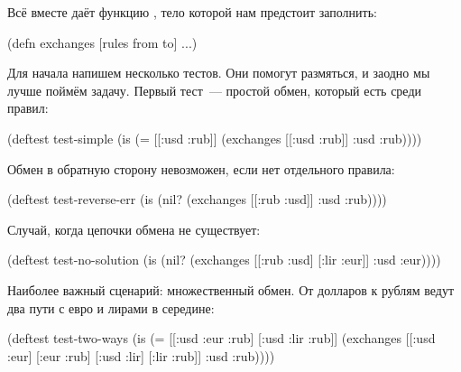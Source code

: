 Всё вместе даёт функцию , тело которой нам предстоит заполнить:

\begin{english}
  \begin{clojure}
(defn exchanges
  [rules from to]
  ...)
  \end{clojure}
\end{english}


Для начала напишем несколько тестов. Они помогут размяться, и заодно мы лучше
поймём задачу. Первый тест~--- простой обмен, который есть среди правил:

\begin{english}
  \begin{clojure}
(deftest test-simple
  (is (= [[:usd :rub]]
         (exchanges [[:usd :rub]]
                    :usd
                    :rub))))
  \end{clojure}
\end{english}

Обмен в обратную сторону невозможен, если нет отдельного правила:

\begin{english}
  \begin{clojure}
(deftest test-reverse-err
  (is (nil? (exchanges [[:rub :usd]]
                       :usd
                       :rub))))
  \end{clojure}
\end{english}

Случай, когда цепочки обмена не существует:

\begin{english}
  \begin{clojure}
(deftest test-no-solution
  (is (nil? (exchanges [[:rub :usd]
                        [:lir :eur]]
                       :usd
                       :eur))))
  \end{clojure}
\end{english}

Наиболее важный сценарий: множественный обмен. От долларов к рублям ведут два
пути с евро и лирами в середине:

\begin{english}
  \begin{clojure}
(deftest test-two-ways
  (is (= [[:usd :eur :rub]
          [:usd :lir :rub]]
         (exchanges [[:usd :eur]
                     [:eur :rub]
                     [:usd :lir]
                     [:lir :rub]] :usd :rub))))
  \end{clojure}
\end{english}

